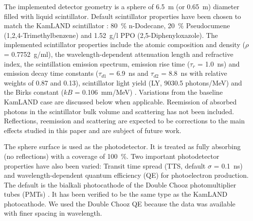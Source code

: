 \documentclass[aps,prc,twocolumn,groupedaddress,showpacs,amsmath,amssymb,floatfix,superscriptaddress]{revtex4}
\begin{document}
The implemented detector geometry is a sphere of 6.5~m (or 0.65~m) diameter filled with liquid scintillator. Default scintillator properties have been chosen to match the KamLAND scintillator \cite{tbd}: 80~\% n-Dodecane, 20~\% Pseudocumene (1,2,4-Trimethylbenzene) and 1.52~g/l PPO (2,5-Diphenyloxazole). The implemented scintillator properties include the atomic composition and density ($\rho$ = 0.7752~g/ml), the wavelength-dependent attenuation length and refractive index, the scintillation emission spectrum, emission rise time ($\tau_r$ = 1.0~ns) and emission decay time constants ($\tau_{d1}$ = 6.9~ns and $\tau_{d2}$ = 8.8~ns with relative weights of 0.87 and 0.13), scintillator light yield (LY, 9030.5 photons/MeV) and the Birks constant ($kB$ = 0.106~mm/MeV) \cite{tbd}. Variations from the baseline KamLAND case are discussed below when applicable. Reemission of absorbed photons in the scintillator bulk volume and scattering has not been included. Reflections, reemission and scattering are expected to be corrections to the main effects studied in this paper and are subject of future work. 

The sphere surface is used as the photodetector. It is treated as fully absorbing (no reflections) with a coverage of 100~\%. Two important photodetector properties have also been varied: Transit time spread (TTS, default $\sigma$ = 0.1~ns) and wavelength-dependent quantum efficiency (QE) for photoelectron production. The default is the bialkali photocathode of the Double Chooz photomultiplier tubes (PMTs) \cite{tbd}. It has been verified to be the same type as the KamLAND photocathode. We used the Double Chooz QE because the data was available with finer spacing in wavelength.
\end{document}
